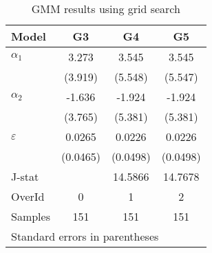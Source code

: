 \begin{table}[h!]\centering
\caption{GMM results using grid search}
\begin{tabular}{l*{3}{c}}
\hline\hline
Model           &\multicolumn{1}{c}{G3}&\multicolumn{1}{c}{G4}&\multicolumn{1}{c}{G5}\\
\hline
$\alpha_1$           &       3.273       &       3.545         &       3.545         \\
                &     (3.919)       &     (5.548)         &     (5.547)         \\
\hline
$\alpha_2$           &      -1.636       &      -1.924         &      -1.924        \\
                &    (3.765)        &    (5.381)         &    (5.381)         \\
\hline
$\varepsilon$             &      0.0265       &      0.0226        &      0.0226         \\
                &  (0.0465)         &  (0.0498)         &  (0.0498)         \\
\hline
J-stat          &                   &  14.5866          &  14.7678 \\
OverId          &       0           &           1         &           2         \\
Samples         &       151         &           151         &           151         \\
\hline\hline
\multicolumn{5}{l}{\footnotesize Standard errors in parentheses}\\
\end{tabular}\label{tab:gmm_table}
\end{table}
